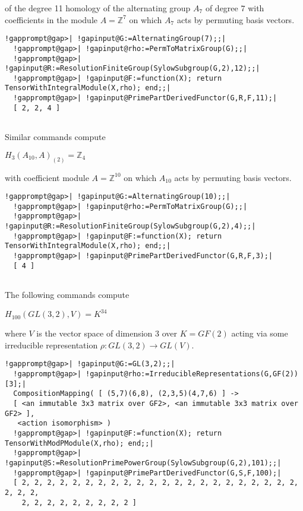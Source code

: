 \documentclass[a4paper,11pt]{report}
\begin{document}
{{of the degree 11 homology of the alternating group $A_7$ of degree $7$ with coefficients in the module $A=\mathbb Z^7$ on which $A_7$ acts by permuting basis vectors. 
\begin{Verbatim}[commandchars=!@|,fontsize=\small,frame=single,label=Example]
  !gapprompt@gap>| !gapinput@G:=AlternatingGroup(7);;|
  !gapprompt@gap>| !gapinput@rho:=PermToMatrixGroup(G);;|
  !gapprompt@gap>| !gapinput@R:=ResolutionFiniteGroup(SylowSubgroup(G,2),12);;|
  !gapprompt@gap>| !gapinput@F:=function(X); return TensorWithIntegralModule(X,rho); end;;|
  !gapprompt@gap>| !gapinput@PrimePartDerivedFunctor(G,R,F,11);|
  [ 2, 2, 4 ]
  
\end{Verbatim}
 Similar commands compute 

$H_{3}(A_{10},A)_{(2)} = \mathbb Z_4$ 

with coefficient module $A=\mathbb Z^{10}$ on which $A_{10}$ acts by permuting basis vectors. 
\begin{Verbatim}[commandchars=!@|,fontsize=\small,frame=single,label=Example]
  !gapprompt@gap>| !gapinput@G:=AlternatingGroup(10);;|
  !gapprompt@gap>| !gapinput@rho:=PermToMatrixGroup(G);;|
  !gapprompt@gap>| !gapinput@R:=ResolutionFiniteGroup(SylowSubgroup(G,2),4);;|
  !gapprompt@gap>| !gapinput@F:=function(X); return TensorWithIntegralModule(X,rho); end;;|
  !gapprompt@gap>| !gapinput@PrimePartDerivedFunctor(G,R,F,3);|
  [ 4 ]
  
\end{Verbatim}
 

The following commands compute 

$H_{100}(GL(3,2),V)= K^{34}$ 

where $V$ is the vector space of dimension $3$ over $K=GF(2)$ acting via some irreducible representation $\rho\colon GL(3,2) \rightarrow GL(V)$. 
\begin{Verbatim}[commandchars=!@|,fontsize=\small,frame=single,label=Example]
  !gapprompt@gap>| !gapinput@G:=GL(3,2);;|
  !gapprompt@gap>| !gapinput@rho:=IrreducibleRepresentations(G,GF(2))[3];|
  CompositionMapping( [ (5,7)(6,8), (2,3,5)(4,7,6) ] -> 
  [ <an immutable 3x3 matrix over GF2>, <an immutable 3x3 matrix over GF2> ],
   <action isomorphism> )
  !gapprompt@gap>| !gapinput@F:=function(X); return TensorWithModPModule(X,rho); end;;|
  !gapprompt@gap>| !gapinput@S:=ResolutionPrimePowerGroup(SylowSubgroup(G,2),101);;|
  !gapprompt@gap>| !gapinput@PrimePartDerivedFunctor(G,S,F,100);|
  [ 2, 2, 2, 2, 2, 2, 2, 2, 2, 2, 2, 2, 2, 2, 2, 2, 2, 2, 2, 2, 2, 2, 2, 2, 2, 
    2, 2, 2, 2, 2, 2, 2, 2, 2 ]
  

\end{Verbatim}}}
\end{document}
